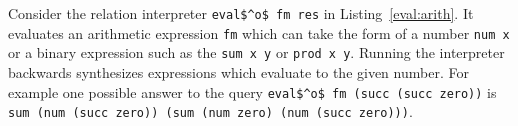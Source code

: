 Consider the relation interpreter \lstinline{eval$^o$ fm res} in Listing~\ref{eval:arith}.
It evaluates an arithmetic expression \lstinline{fm} which can take the form of a number \lstinline{num x} or a binary expression such as the \lstinline{sum x y} or \lstinline{prod x y}.
Running the interpreter backwards synthesizes expressions which evaluate to the given number. For example one possible answer to the query \lstinline{eval$^o$ fm (succ (succ zero))} is \lstinline{sum (num (succ zero)) (sum (num zero) (num (succ zero)))}.


